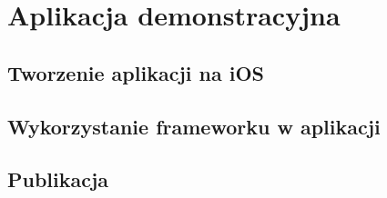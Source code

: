 \chapter{Aplikacja demonstracyjna}

\section{Tworzenie aplikacji na iOS}

\section{Wykorzystanie frameworku w aplikacji}

\section{Publikacja}
